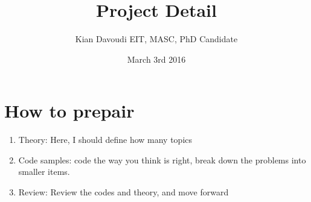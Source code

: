 \documentclass{IEEEtran}
\title{Project Detail}
\author{Kian Davoudi EIT, MASC, PhD Candidate}
\date{March 3rd 2016}
\begin{document}
\maketitle

\section{How to prepair}
\begin{enumerate}
\item Theory: Here, I should define how many topics
\item Code samples: code the way you think is right, break down the problems into smaller items. 
\item Review: Review the codes and theory, and move forward
\end{enumerate}













\end{document}
